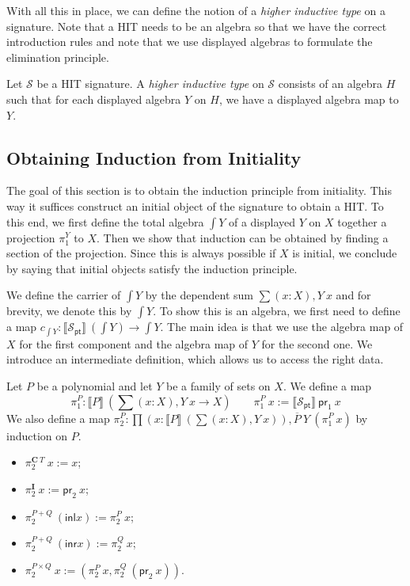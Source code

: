 \documentclass[9pt]{entcs}
\newcommand{\term}[1]{\mathsf{#1}}
\newcommand{\constructor}[1]{\mathbf{#1}}
\newcommand{\deprod}[3]{\prod(#1 : #2), #3} %
\newcommand{\desum}[3]{\sum(#1 : #2), #3} %
\newcommand{\0}{\textbf{0}} %
\newcommand{\1}{\textbf{1}} %
\newcommand{\inl}{\term{inl}} %
\newcommand{\inr}{\term{inr}} %
\newcommand{\prl}{\term{pr}_1} %
\newcommand{\prr}{\term{pr}_2} %
\newcommand{\Def}{:=} %
\newcommand{\C}{\constructor{C}} %
\newcommand{\I}{\constructor{I}} %
\newcommand{\sumP}[2]{#1 + #2} %
\newcommand{\prodP}[2]{#1 \times #2} %
\newcommand{\pt}[0]{\textsf{pt}}
\newcommand{\pointc}[1]{#1_{\pt}} %
\newcommand{\sig}{\mathcal{S}} %
\newcommand{\semP}[1]{\llbracket #1 \rrbracket} %
\newcommand{\polydact}[2]{\overline{#1} \> #2} %
\newcommand{\total}[1]{\int #1} %
\newcommand{\proj}[1]{\pi_1^{#1}} %
\newcommand{\Ppl}[1]{\pi_1^{#1}} %
\newcommand{\Ppr}[1]{\pi_2^{#1}} %
\begin{document}
With all this in place, we can define the notion of a \emph{higher inductive type} on a signature.
Note that a HIT needs to be an algebra so that we have the correct introduction rules and note that we use displayed algebras to formulate the elimination principle.

\begin{definition}
Let $\sig$ be a HIT signature.
A \emph{higher inductive type} on $\sig$ consists of an algebra $H$ such that for each displayed algebra $Y$ on $H$, we have a displayed algebra map to $Y$.
\end{definition}

\subsection{Obtaining Induction from Initiality}
The goal of this section is to obtain the induction principle from initiality.
This way it suffices construct an initial object of the signature to obtain a HIT.
To this end, we first define the total algebra $\total{Y}$ of a displayed $Y$ on $X$ together a projection $\proj{Y}$ to $X$.
Then we show that induction can be obtained by finding a section of the projection.
Since this is always possible if $X$ is initial, we conclude by saying that initial objects satisfy the induction principle.

We define the carrier of $\total{Y}$ by the dependent sum $\desum{x}{X}{Y \> x}$ and for brevity, we denote this by $\total{Y}$.
To show this is an algebra, we first need to define a map $c_{\total{Y}} : \semP{\pointc{\sig}} \> (\total{Y}) \rightarrow \total{Y}$.
The main idea is that we use the algebra map of $X$ for the first component and the algebra map of $Y$ for the second one.
We introduce an intermediate definition, which allows us to access the right data.

\begin{definition}
Let $P$ be a polynomial and let $Y$ be a family of sets on $X$.
We define a map
\[
\Ppl{P} : \semP{P} \> (\desum{x}{X}{Y \> x} \rightarrow X)
\quad \quad
\Ppl{P} \> x \Def \semP{\pointc{\sig}} \> \prl \> x
\]
We also define a map $\Ppr{P} : \deprod{x}{\semP{P} \> (\desum{x}{X}{Y \> x})}{\polydact{P}{Y} \> (\Ppl{P} \> x)}$ by induction on $P$.
\begin{itemize}
	\item $\Ppr{\C \> T} \> x  \Def x$;
	\item $\Ppr{\I} \> x \Def \prr \> x$;
	\item $\Ppr{\sumP{P}{Q}} \> (\inl x) \Def \Ppr{P} \> x$;
	\item $\Ppr{\sumP{P}{Q}} \> (\inr x) \Def \Ppr{Q} \> x$;
	\item $\Ppr{\prodP{P}{Q}} \> x \Def (\Ppr{P} \> x , \Ppr{Q} \> (\prr \> x))$.
\end{itemize}
\end{definition}
\end{document}
